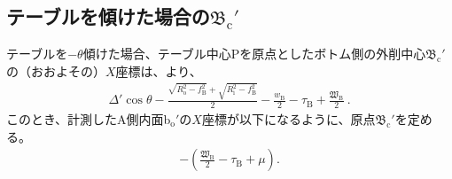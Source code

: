 \subsection[テーブルを傾けた場合の\texorpdfstring{$\mathfrak B_\mathrm c'$}{Bc'}]
           {テーブルを傾けた場合の$\boldsymbol{\mathfrak B_\mathrm c'}$}
テーブルを$-\theta$傾けた場合、テーブル中心Pを原点としたボトム側の外削中心$\mathfrak B_\mathrm c'$の（おおよその）$X$座標は、より、
\begin{align}
  \label{eq:gaisakucenterBt}
  \Delta'\cos\theta-\frac{\sqrt{R_\mathrm o^2-f_\mathrm B^2}+\sqrt{R_\mathrm i^2-f_\mathrm B^2}}2
  -\frac{w_\mathrm B}2-\tau_\mathrm B+\frac{\mathfrak W_\mathrm B}2\ .
\end{align}
このとき、計測したA側内面b$_\mathrm o'$の$X$座標が以下になるように、原点$\mathfrak B_\mathrm c'$を定める。
\begin{align}
  \label{eq:gaisakucenterBr}
  -\left(\frac{\mathfrak W_\mathrm B}2-\tau_\mathrm B+\mu\right).
\end{align}


